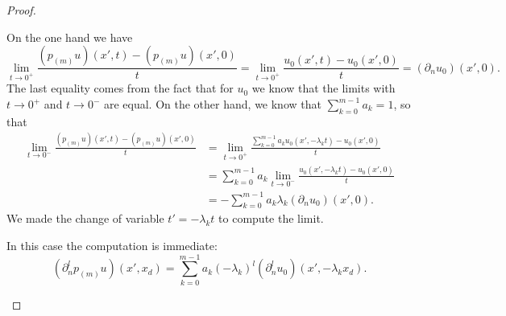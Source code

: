 \begin{proof}
\begin{subproof}
		On the one hand we have
		\begin{equation}
			\lim_{t\to 0^+} \frac{ (p_{(m)}u)(x',t)-(p_(m)u)(x',0) }{ t }=\lim_{t\to 0^+} \frac{ u_0(x',t)-u_0(x',0) }{ t }=(\partial_nu_0)(x',0).
		\end{equation}
		The last equality comes from the fact that for \( u_0\) we know that the limits with \( t\to 0^+\) and \( t\to 0^-\) are equal. On the other hand, we know that \( \sum_{k=0}^{m-1}a_k=1\), so that
		\begin{subequations}
			\begin{align}
				\lim_{t\to 0^-} \frac{ (p_{(m)}u)(x',t)-(p_(m)u)(x',0) }{ t } & =\lim_{t\to 0^+} \frac{ \sum_{k=0}^{m-1}a_ku_0(x',-\lambda_kt)-u_0(x',0) }{ t } \\
				                                                              & =\sum_{k=0}^{m-1}a_k\lim_{t\to 0^-} \frac{ u_0(x',-\lambda_kt)-u_0(x',0) }{ t } \\
				                                                              & =-\sum_{k=0}^{m-1}a_k\lambda_k(\partial_n u_0)(x',0).
			\end{align}
		\end{subequations}
		We made the change of variable \( t'=-\lambda_kt\) to compute the limit.


		In this case the computation is immediate:
		\begin{equation}
			(\partial_n^lp_{(m)}u)(x',x_d)=\sum_{k=0}^{m-1}a_k(-\lambda_k)^l(\partial_n^lu_0)(x',-\lambda_kx_d).
		\end{equation}

		\spitem[Induction]


\end{subproof}
\end{proof}
